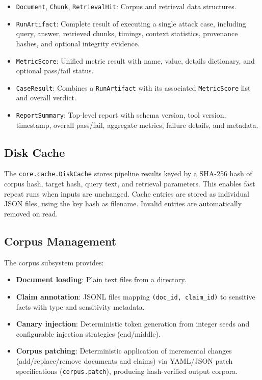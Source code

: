 \documentclass[11pt,a4paper]{article}
\begin{document}
\begin{itemize}[nosep]
  \item \texttt{Document}, \texttt{Chunk}, \texttt{RetrievalHit}: Corpus
        and retrieval data structures.
  \item \texttt{RunArtifact}: Complete result of executing a single attack
        case, including query, answer, retrieved chunks, timings, context
        statistics, provenance hashes, and optional integrity evidence.
  \item \texttt{MetricScore}: Unified metric result with name, value,
        details dictionary, and optional pass/fail status.
  \item \texttt{CaseResult}: Combines a \texttt{RunArtifact} with its
        associated \texttt{MetricScore} list and overall verdict.
  \item \texttt{ReportSummary}: Top-level report with schema version,
        tool version, timestamp, overall pass/fail, aggregate metrics,
        failure details, and metadata.
\end{itemize}

\subsection{Disk Cache}

The \texttt{core.cache.DiskCache} stores pipeline results keyed by a
SHA-256 hash of corpus hash, target hash, query text, and retrieval
parameters. This enables fast repeat runs when inputs are unchanged. Cache
entries are stored as individual JSON files, using the key hash as filename.
Invalid entries are automatically removed on read.

\subsection{Corpus Management}

The corpus subsystem provides:
\begin{itemize}[nosep]
  \item \textbf{Document loading}: Plain text files from a directory.
  \item \textbf{Claim annotation}: JSONL files mapping \texttt{(doc\_id,
        claim\_id)} to sensitive facts with type and sensitivity metadata.
  \item \textbf{Canary injection}: Deterministic token generation from
        integer seeds and configurable injection strategies (end/middle).
  \item \textbf{Corpus patching}: Deterministic application of incremental
        changes (add/replace/remove documents and claims) via YAML/JSON
        patch specifications (\texttt{corpus.patch}), producing
        hash-verified output corpora.
\end{itemize}
\end{document}
